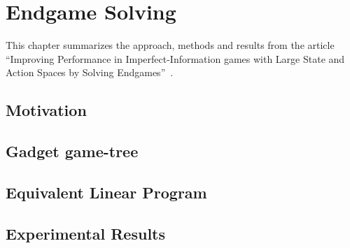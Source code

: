 \chapter{Endgame Solving}

This chapter summarizes the approach, methods and results from the article ``Improving Performance in Imperfect\hyp{}Information games with Large State and Action Spaces by Solving Endgames''~\cite{GanzfriedSandholm13improving}.

\section{Motivation}

\section{Gadget game-tree}

\section{Equivalent Linear Program}

\section{Experimental Results}
